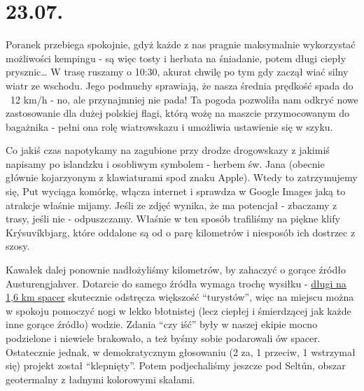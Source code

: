 \chapter{23.07.}

Poranek przebiega spokojnie, gdyż każde z nas pragnie maksymalnie wykorzystać możliwości kempingu - są więc tosty i herbata na śniadanie, potem długi ciepły prysznic… W trasę ruszamy o 10:30, akurat chwilę po tym gdy zaczął wiać silny wiatr ze wschodu. Jego podmuchy sprawiają, że nasza średnia prędkość spada do ~12 km/h - no, ale przynajmniej nie pada! Ta pogoda pozwoliła nam odkryć nowe zastosowanie dla dużej polskiej flagi, którą wożę na maszcie przymocowanym do bagażnika - pełni ona rolę wiatrowskazu i umożliwia ustawienie się w szyku.


Co jakiś czas napotykamy na zagubione przy drodze drogowskazy z jakimiś napisamy po islandzku i osobliwym symbolem - herbem św. Jana (obecnie głównie kojarzyonym z klawiaturami spod znaku Apple). Wtedy to zatrzymujemy się, Put wyciąga komórkę, włącza internet i sprawdza w Google Images jaką to atrakcje właśnie mijamy. Jeśli ze zdjęć wynika, że ma potencjał - zbaczamy z trasy, jeśli nie - odpuszczamy. Właśnie w ten sposób trafiliśmy na piękne klify Krýsuvíkbjarg, które oddalone są od  o parę kilometrów i niesposób ich dostrzec z szosy.


Kawałek dalej ponownie nadłożyliśmy kilometrów, by zahaczyć o gorące źródło Austurengjahver. Dotarcie do samego źródła wymaga trochę wysiłku - \href{http://www.openstreetmap.org/way/33182596}{długi na 1,6 km spacer} skutecznie odstręcza większość “turystów”, więc na miejscu można w spokoju pomoczyć nogi w lekko błotnistej (lecz ciepłej i śmierdzącej jak każde inne gorące źródło) wodzie. Zdania “czy iść” były w naszej ekipie mocno podzielone i niewiele brakowało, a też byśmy sobie podarowali ów spacer. Ostatecznie jednak, w demokratycznym głosowaniu (2 za, 1 przeciw, 1 wstrzymał się) projekt został “klepnięty”. Potem podjechaliśmy jeszcze pod Seltún, obszar geotermalny z ładnymi kolorowymi skałami.

